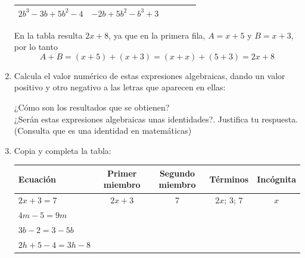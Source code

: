 \documentclass[10pt,twoside]{article}
\begin{document}
\begin{enumerate}
\begin{center}
\begin{tabular}{|l|l|c|c|c|c|}
\hline 
$2b^{3}-3b+5b^{2}-4$ & $-2b+5b^{2}-b^{3}+3$ &  &  &  &  \\ 
\hline 
\end{tabular} 
\end{center}
En la tabla resulta $2x+8$, ya que en la primera fila, $A=x+5$ y $B=x+3$, por lo tanto \[A+B=(x+5)+(x+3)=(x+x)+(5+3)=2x+8\]
\item Calcula el valor numérico de estas expresiones algebraicas, dando un valor positivo y otro negativo a las letras que aparecen en ellas:
\begin{enumerate}
\end{enumerate}
¿Cómo son los resultados que se obtienen?\\
¿Serán estas expresiones algebraicas unas identidades?. Justifica tu respuesta. (Consulta que es una identidad en matemáticas)
\item Copia y completa la tabla:
\begin{center}
\begin{tabular}{|l|c|c|c|c|}
\hline 
\hspace*{0.5cm} Ecuación & Primer miembro & Segundo miembro & Términos & Incógnita \\ 
\hline 
$2x+3=7$ & $2x+3$ & 7 & $2x$; \quad $3$; \quad $7$& $x$  \\ 
\hline 
$4m-5=9m$ &  &  &  &  \\ 
\hline 
$3b-2=3-5b$ &  &  &  &  \\ 
\hline 
$2h+5-4=3h-8$ &  &  &  &  \\ 
\hline 
\end{tabular} 
\end{center}
\end{enumerate}
\end{document}
